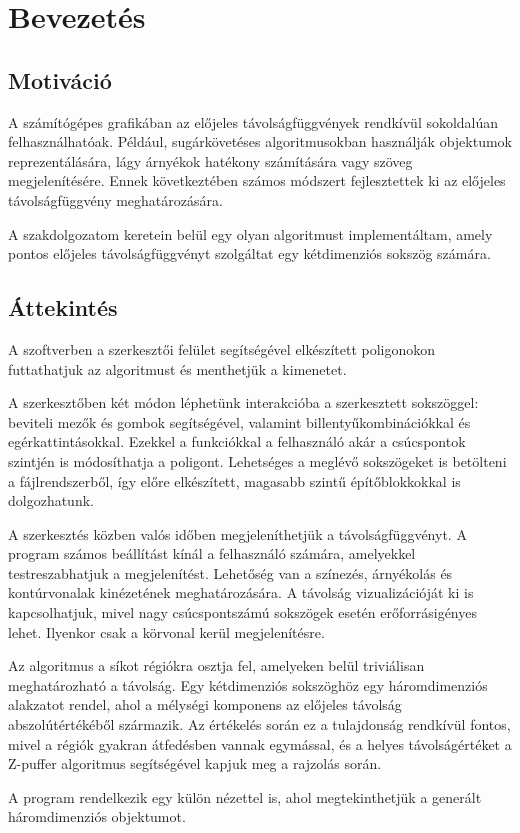 \chapter{Bevezetés}
\label{ch:intro}

\section{Motiváció}\label{sec:motivacio}
A számítógépes grafikában az előjeles távolságfüggvények rendkívül sokoldalúan felhasználhatóak. Például, sugárkövetéses algoritmusokban használják objektumok reprezentálására, lágy árnyékok hatékony számítására vagy szöveg megjelenítésére. Ennek következtében számos módszert fejlesztettek ki az előjeles távolságfüggvény meghatározására.

A szakdolgozatom keretein belül egy olyan algoritmust implementáltam, amely pontos előjeles távolságfüggvényt szolgáltat egy kétdimenziós sokszög számára.

\section{Áttekintés}\label{sec:attekintes}
A szoftverben a szerkesztői felület segítségével elkészített poligonokon futtathatjuk az algoritmust és menthetjük a kimenetet.

A szerkesztőben két módon léphetünk interakcióba a szerkesztett sokszöggel: beviteli mezők és gombok segítségével, valamint billentyűkombinációkkal és egérkattintásokkal. Ezekkel a funkciókkal a felhasználó akár a csúcspontok szintjén is módosíthatja a poligont. Lehetséges a meglévő sokszögeket is betölteni a fájlrendszerből, így előre elkészített, magasabb szintű építőblokkokkal is dolgozhatunk.

A szerkesztés közben valós időben megjeleníthetjük a távolságfüggvényt. A program számos beállítást kínál a felhasználó számára, amelyekkel testreszabhatjuk a megjelenítést. Lehetőség van a színezés, árnyékolás és kontúrvonalak kinézetének meghatározására. A távolság vizualizációját ki is kapcsolhatjuk, mivel nagy csúcspontszámú sokszögek esetén erőforrásigényes lehet. Ilyenkor csak a körvonal kerül megjelenítésre.

Az algoritmus a síkot régiókra osztja fel, amelyeken belül triviálisan meghatározható a távolság. Egy kétdimenziós sokszöghöz egy háromdimenziós alakzatot rendel, ahol a mélységi komponens az előjeles távolság abszolútértékéből származik. Az értékelés során ez a tulajdonság rendkívül fontos, mivel a régiók gyakran átfedésben vannak egymással, és a helyes távolságértéket a Z-puffer algoritmus segítségével kapjuk meg a rajzolás során.

A program rendelkezik egy külön nézettel is, ahol megtekinthetjük a generált háromdimenziós objektumot.
